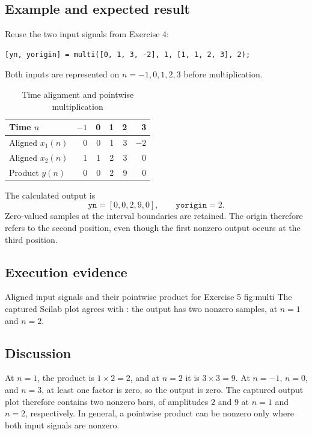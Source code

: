 \subsection{Example and expected result}
Reuse the two input signals from Exercise 4:
\begin{lstlisting}[numbers=none]
[yn, yorigin] = multi([0, 1, 3, -2], 1, [1, 1, 2, 3], 2);
\end{lstlisting}
Both inputs are represented on $n=-1,0,1,2,3$ before multiplication.
\begin{table}[H]
  \centering
  \caption{Time alignment and pointwise multiplication}
  \label{tab:multi}
  \begin{tabular}{lrrrrr}
    \toprule
    Time $n$ & $-1$ & 0 & 1 & 2 & 3\\
    \midrule
    Aligned $x_1(n)$ & 0 & 0 & 1 & 3 & $-2$\\
    Aligned $x_2(n)$ & 1 & 1 & 2 & 3 & 0\\
    Product $y(n)$ & 0 & 0 & 2 & 9 & 0\\
    \bottomrule
  \end{tabular}
\end{table}
The calculated output is
\[
  \texttt{yn}=[0,0,2,9,0],\qquad \texttt{yorigin}=2.
\]
Zero-valued samples at the interval boundaries are retained. The origin
therefore refers to the second position, even though the first nonzero
output occurs at the third position.

\subsection{Execution evidence}
  {Aligned input signals and their pointwise product for Exercise 5}
  {fig:multi}
The captured Scilab plot agrees with : the output has
two nonzero samples, at $n=1$ and $n=2$.

\subsection{Discussion}
At $n=1$, the product is $1\times2=2$, and at $n=2$ it is
$3\times3=9$. At $n=-1$, $n=0$, and $n=3$, at least one factor is
zero, so the output is zero. The captured output plot therefore contains
two nonzero bars, of amplitudes $2$ and $9$ at $n=1$ and $n=2$,
respectively. In general, a pointwise product can be nonzero only where
both input signals are nonzero.
